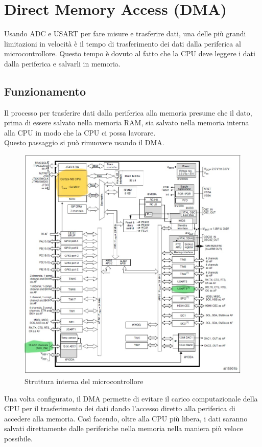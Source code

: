 \pagebreak
\section{Direct Memory Access (DMA)}
Usando ADC e USART per fare misure e trasferire dati, una delle più grandi limitazioni in velocità è il tempo di trasferimento dei dati dalla periferica al microcontrollore. Questo tempo è dovuto al fatto che la CPU deve leggere i dati dalla periferica e salvarli in memoria.\\

\subsection{Funzionamento}

Il processo per trasferire dati dalla periferica alla memoria presume che il dato, prima di essere salvato nella memoria RAM, sia salvato nella memoria interna alla CPU in modo che la CPU ci possa lavorare. \\
Questo passaggio si può rimuovere usando il DMA.

\begin{figure}[h]
    \centering
    \includegraphics[width=0.7\linewidth]{microcontrollore/assets/Cortex_structure.jpg}
    \caption{Struttura interna del microcontrollore}
    \label{fig:Cortex}
\end{figure}

Una volta configurato, il DMA permette di evitare il carico computazionale della CPU per il trasferimento dei dati dando l'accesso diretto alla periferica di accedere alla memoria.
Così facendo, oltre alla CPU più libera, i dati saranno salvati direttamente dalle periferiche nella memoria nella maniera più veloce possibile.\\


